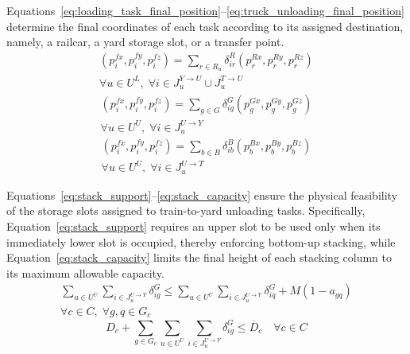 Equations~\ref{eq:loading_task_final_position}--\ref{eq:truck_unloading_final_position} determine the final coordinates of each task according to its assigned destination, namely, a railcar, a yard storage slot, or a transfer point.
\begin{equation}
\label{eq:loading_task_final_position}
\begin{gathered}
\left(p_i^{fx},p_i^{fy},p_i^{fz}\right)=\sum_{r\in R_u}\delta_{ir}^{R}\left(p_r^{Rx},p_r^{Ry},p_r^{Rz}\right)\\ \forall u\in U^{L},\;\forall i\in J_u^{Y\rightarrow U}\cup J_u^{T\rightarrow U}
\end{gathered}
\end{equation}
\begin{equation}
\label{eq:yard_unloading_final_position}
\begin{gathered}
\left(p_i^{fx},p_i^{fy},p_i^{fz}\right)=\sum_{g\in G}\delta_{ig}^{G}\left(p_g^{Gx},p_g^{Gy},p_g^{Gz}\right)\\ \forall u\in U^{U},\;\forall i\in J_u^{U\rightarrow Y}
\end{gathered}
\end{equation}
\begin{equation}
\label{eq:truck_unloading_final_position}
\begin{gathered}
\left(p_i^{fx},p_i^{fy},p_i^{fz}\right)=\sum_{b\in B}\delta_{ib}^{B}\left(p_b^{Bx},p_b^{By},p_b^{Bz}\right)\\ \forall u\in U^{U},\;\forall i\in J_u^{U\rightarrow T}
\end{gathered}
\end{equation}

Equations~\ref{eq:stack_support}--\ref{eq:stack_capacity} ensure the physical feasibility of the storage slots assigned to train-to-yard unloading tasks. Specifically, Equation~\ref{eq:stack_support} requires an upper slot to be used only when its immediately lower slot is occupied, thereby enforcing bottom-up stacking, while Equation~\ref{eq:stack_capacity} limits the final height of each stacking column to its maximum allowable capacity. 
\begin{equation}
\label{eq:stack_support}
\begin{gathered}
\sum_{u\in U^{U}}
\sum_{i\in J_u^{U\rightarrow Y}}
\delta_{ig}^{G}
\leq
\sum_{u\in U^{U}}
\sum_{i\in J_u^{U\rightarrow Y}}
\delta_{iq}^{G}+
M(1-a_{gq})
\\
\forall c\in C,\;
\forall g,q\in G_c
\end{gathered}
\end{equation}
\begin{equation}
\label{eq:stack_capacity}
D_c+
\sum_{g\in G_c}
\sum_{u\in U^{U}}
\sum_{i\in J_u^{U\rightarrow Y}}
\delta_{ig}^{G}
\leq
\overline{D}_c
\quad
\forall c\in C
\end{equation}

